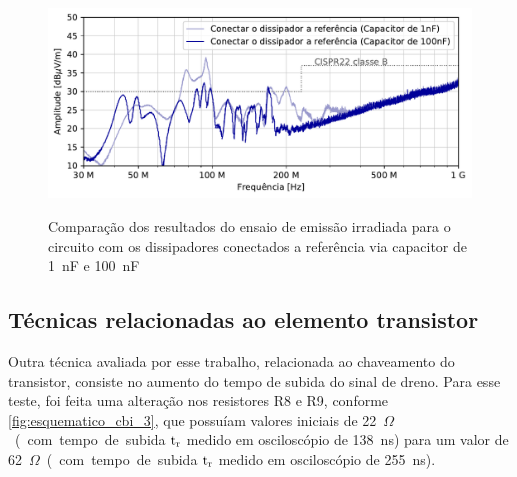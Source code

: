     \begin{figure}[H]
    	\centering
    	\caption{Comparação dos resultados do ensaio de emissão irradiada para o circuito com os dissipadores conectados a referência via capacitor de \SI{1}{\nano\farad} e \SI{100}{\nano\farad}}
    	\includegraphics[scale=.85]{pdf/rad/Conectar o dissipador a referência (Capacitor de 1nF)-Conectar o dissipador a referência (Capacitor de 100nF).pdf}
    	\label{fig:med_rad_cap1n_cap100n_dissip}
    \end{figure}


    \subsection{Técnicas relacionadas ao elemento transistor} \label{cap:result_tecnicas_chaveam}
    
    Outra técnica avaliada por esse trabalho, relacionada ao chaveamento do transistor, consiste no aumento do tempo de subida do sinal de dreno. Para esse teste, foi feita uma alteração nos resistores R8 e R9, conforme \autoref{fig:esquematico_cbi_3}, que possuíam valores iniciais de \SI{22}{$\Omega$} (com tempo de subida $\text{t}_\text{r}$ medido em osciloscópio de \SI{138}{\nano\second}) para um valor de \SI{62}{$\Omega$} (com tempo de subida $\text{t}_\text{r}$ medido em osciloscópio de \SI{255}{\nano\second}). 
    
